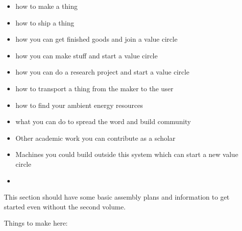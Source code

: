 \begin{itemize}
\item
  how to make a thing
\item
  how to ship a thing
\item
  how you can get finished goods and join a value circle
\item
  how you can make stuff and start a value circle
\item
  how you can do a research project and start a value circle
\item
  how to transport a thing from the maker to the user
\item
  how to find your ambient energy resources
\item
  what you can do to spread the word and build community
\item
  Other academic work you can contribute as a scholar
\item
  Machines you could build outside this system which can start a new
  value circle
\item
\end{itemize}

This section should have some basic assembly plans and information to
get started even without the second volume.

Things to make here:

